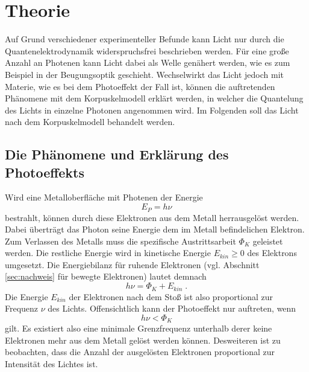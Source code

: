 \section{Theorie}
\label{sec:Theorie}
Auf Grund verschiedener experimenteller Befunde kann Licht nur durch die Quantenelektrodynamik widerspruchsfrei beschrieben werden. 
Für eine große Anzahl an Photenen kann Licht dabei als Welle genähert werden, wie es zum Beispiel in der Beugungsoptik geschieht. 
Wechselwirkt das Licht jedoch mit Materie, wie es bei dem Photoeffekt der Fall ist, können die auftretenden Phänomene mit dem 
Korpuskelmodell erklärt werden, in welcher die Quantelung des Lichts in einzelne Photonen angenommen wird. Im Folgenden soll 
das Licht nach dem Korpuskelmodell behandelt werden. 

\subsection{Die Phänomene und Erklärung des Photoeffekts}
\label{sec:phänomene}
Wird eine Metalloberfläche mit Photenen der Energie 
\begin{equation}
    E_{P}=h\nu
    \label{eqn:photon}
\end{equation}
bestrahlt, können durch diese Elektronen aus dem Metall herrausgelöst werden. Dabei überträgt das Photon seine Energie dem im Metall 
befindelichen Elektron. Zum Verlassen des Metalls muss die spezifische 
Austrittsarbeit $\Phi_K$ geleistet werden. Die restliche Energie wird in kinetische Energie $E_{kin}\geq 0$ des Elektrons umgesetzt. Die 
Energiebilanz für ruhende Elektronen (vgl. Abschnitt \ref{sec:nachweis} für bewegte Elektronen) lautet demnach
\begin{equation}
    h\nu=\Phi_K+E_{kin}\;.
    \label{eqn:bilanz}
\end{equation}
Die Energie $E_{kin}$ der Elektronen nach dem Stoß ist also proportional zur Frequenz $\nu$ des Lichts.
Offensichtlich kann der Photoeffekt nur auftreten, wenn
\begin{equation*}
    h\nu<\Phi_K
\end{equation*}
gilt. Es existiert also eine minimale Grenzfrequenz unterhalb derer keine Elektronen mehr aus dem Metall gelöst werden können.
Desweiteren ist zu beobachten, dass die Anzahl der ausgelösten Elektronen proportional zur Intensität des Lichtes ist. 

